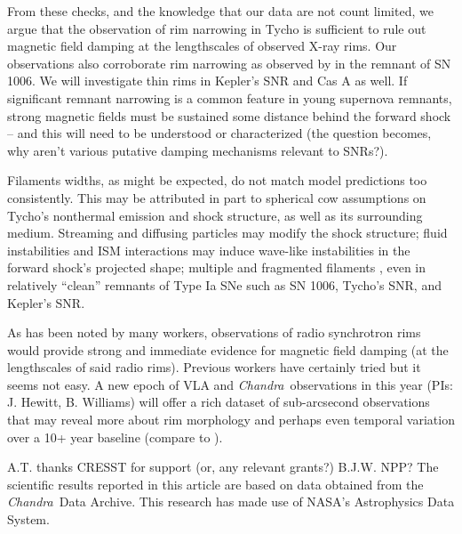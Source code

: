 \documentclass[iop, apj, numberedappendix, twocolappendix]{emulateapj}
\newcommand*{\Chandra}{\textit{Chandra}\ }
\begin{document}
From these checks, and the knowledge that our data are not count limited, we
argue that the observation of rim narrowing in Tycho is sufficient to
rule out magnetic field damping at the lengthscales of observed X-ray rims.
Our observations also corroborate rim narrowing as observed by
\citet{ressler2014} in the remnant of SN 1006.  We will investigate thin rims
in Kepler's SNR and Cas A \citep[but cf.][]{araya2010} as well.  If significant
remnant narrowing is a common feature in young supernova remnants, strong
magnetic fields must be sustained some distance behind the forward shock -- and
this will need to be understood or characterized (the question becomes, why
aren't various putative damping mechanisms relevant to SNRs?).

Filaments widths, as might be expected, do not match model predictions too
consistently.  This may be attributed in part to spherical cow assumptions on
Tycho's nonthermal emission and shock structure, as well as its surrounding
medium.  Streaming and diffusing particles may modify the shock structure;
fluid instabilities and ISM interactions may induce wave-like instabilities in
the forward shock's projected shape; multiple and fragmented filaments
\citep{caprioli2013},
even in relatively ``clean'' remnants of Type Ia SNe such as SN 1006, Tycho's
SNR, and Kepler's SNR. 

As has been noted by many workers, observations of radio synchrotron rims would
provide strong and immediate evidence for magnetic field damping (at the
lengthscales of said radio rims).  Previous workers have certainly tried
\citep{cassam-chenai2007, morlino2012} but it seems not easy.
A new epoch of VLA and \Chandra observations in this year (PIs: J. Hewitt, B.
Williams) will offer a rich dataset of sub-arcsecond observations that may
reveal more about rim morphology and perhaps even temporal variation over a 10+
year baseline (compare to \citet{katsuda2010-sn1006}).

\acknowledgments

A.T. thanks CRESST for support (or, any relevant grants?)
B.J.W. NPP?
The scientific results reported in this article are based on data obtained from
the \Chandra Data Archive.
This research has made use of NASA's Astrophysics Data System.
\end{document}
